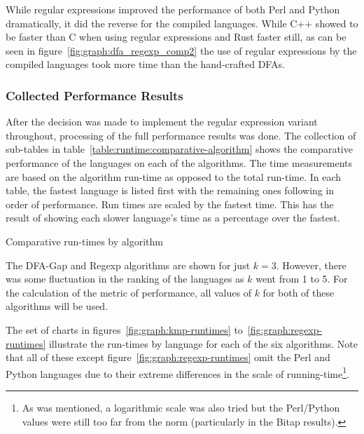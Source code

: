 While regular expressions improved the performance of both Perl and Python dramatically, it did the reverse for the compiled languages. While C++ showed to be faster than C when using regular expressions and Rust faster still, as can be seen in figure~\ref{fig:graph:dfa_regexp_comp2} the use of regular expressions by the compiled languages took more time than the hand-crafted DFAs.

\subsubsection{Collected Performance Results}

After the decision was made to implement the regular expression variant throughout, processing of the full performance results was done. The collection of sub-tables in table~\ref{table:runtime:comparative-algorithm} shows the comparative performance of the languages on each of the algorithms. The time measurements are based on the algorithm run-time as opposed to the total run-time. In each table, the fastest language is listed first with the remaining ones following in order of performance. Run times are scaled by the fastest time. This has the result of showing each slower language's time as a percentage over the fastest.

\begin{table}[!htb]

\caption{Comparative run-times by algorithm}
\label{table:runtime:comparative-algorithm}
\end{table}

The DFA-Gap and Regexp algorithms are shown for just $k=3$. However, there was some fluctuation in the ranking of the languages as $k$ went from 1 to 5. For the calculation of the metric of performance, all values of $k$ for both of these algorithms will be used.

The set of charts in figures~\ref{fig:graph:kmp-runtimes} to~\ref{fig:graph:regexp-runtimes} illustrate the run-times by language for each of the six algorithms. Note that all of these except figure~\ref{fig:graph:regexp-runtimes} omit the Perl and Python languages due to their extreme differences in the scale of running-time\footnote{As was mentioned, a logarithmic scale was also tried but the Perl/Python values were still too far from the norm (particularly in the Bitap results).}.

